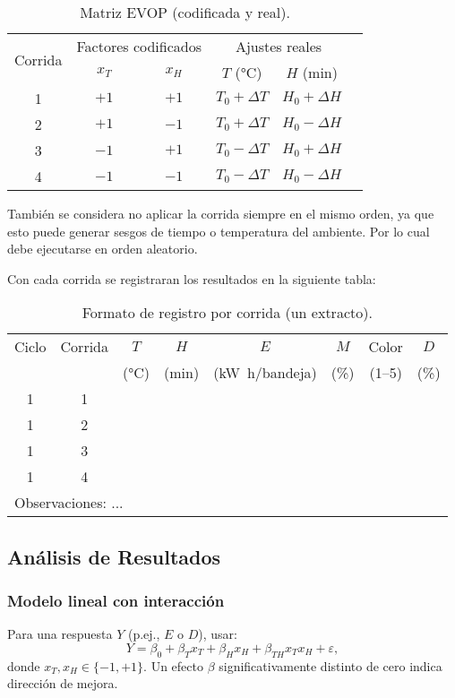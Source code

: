\begin{table}[H]\centering
\caption{Matriz EVOP (codificada y real).}
\begin{tabular}{cccccc}
\toprule
\multirow{2}{*}{Corrida} & \multicolumn{2}{c}{Factores codificados} & \multicolumn{2}{c}{Ajustes reales} \\
\cmidrule(r){2-3}\cmidrule(l){4-5}
 & $x_T$ & $x_H$ & $T$ (\si{\celsius}) & $H$ (\si{\minute}) & \\
\midrule
1 & $+1$ & $+1$ & $T_0+\Delta T$ & $H_0+\Delta H$ \\
2 & $+1$ & $-1$ & $T_0+\Delta T$ & $H_0-\Delta H$ \\
3 & $-1$ & $+1$ & $T_0-\Delta T$ & $H_0+\Delta H$ \\
4 & $-1$ & $-1$ & $T_0-\Delta T$ & $H_0-\Delta H$ \\
\bottomrule
\end{tabular}
\end{table}

También se considera no aplicar la corrida siempre en el mismo orden, ya que esto puede generar sesgos de tiempo o temperatura del ambiente. Por lo cual debe ejecutarse en orden aleatorio.

Con cada corrida se registraran los resultados en la siguiente tabla:
\begin{table}[H]\centering
\caption{Formato de registro por corrida (un extracto).}
\begin{tabular}{cccccccc}
\toprule
Ciclo & Corrida & $T$ & $H$ & $E$ & $M$ & Color & $D$\\
 &  & (\si{\celsius}) & (\si{\minute}) & (\si{\kilo\watt\hour/bandeja}) & (\si{\percent}) & (1--5) & (\si{\percent}) \\
\midrule
1 & 1 &  &  &  &  &  &  \\
1 & 2 &  &  &  &  &  &  \\
1 & 3 &  &  &  &  &  &  \\
1 & 4 &  &  &  &  &  &  \\
\midrule
\multicolumn{8}{l}{\footnotesize Observaciones: {...}}\\
\bottomrule
\end{tabular}
\end{table}

\subsection{Análisis de Resultados}
\subsubsection*{Modelo lineal con interacción}
Para una respuesta $Y$ (p.ej., $E$ o $D$), usar:
\begin{equation}
Y = \beta_0 + \beta_T x_T + \beta_H x_H + \beta_{TH} x_T x_H + \varepsilon,
\end{equation}
donde $x_T,x_H\in\{-1,+1\}$. Un efecto $\beta$ significativamente distinto de cero indica dirección de mejora.

